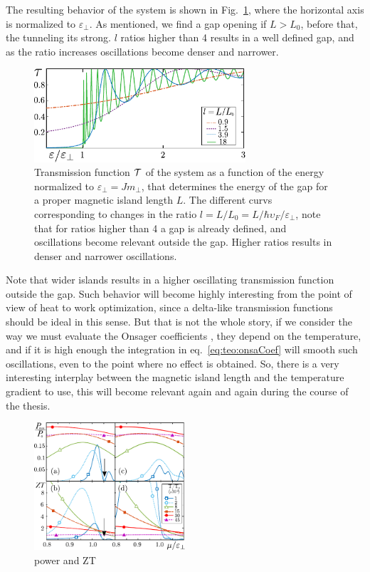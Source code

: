 The resulting behavior of the system is shown in Fig.~\ref{fig:teo:tau1isla}, where the horizontal axis is normalized to $\varepsilon_{\perp}$. As mentioned, we find a gap opening if $L > L_0$, before that, the tunneling its strong. $l$ ratios higher than 4 results in a well defined gap, and as the ratio increases oscillations become denser and narrower.
%
\begin{figure}
    \centering
    \includegraphics[width = 0.7\textwidth]{figures/theory/fig2.pdf}
    \caption{Transmission function $\mathcal{T}$ of the system as a function of the energy normalized to $\varepsilon_{\perp} = J m_{\perp}$, that determines the energy of the gap for a proper magnetic island length $L$. The different curvs corresponding to changes in the ratio $l = L/L_0 = L/\hbar \upsilon_F/\varepsilon_{\perp}$, note that for ratios higher than 4 a gap is already defined, and oscillations become relevant outside the gap. Higher ratios results in denser and narrower oscillations.}
    \label{fig:teo:tau1isla}
\end{figure}
%
Note that wider islands results in a higher oscillating transmission function outside the gap. Such behavior will become highly interesting from the point of view of heat to work optimization, since a delta-like transmission functions should be ideal in this sense. But that is not the whole story, if we consider the way we must evaluate the Onsager coefficients , they depend on the temperature, and if it is high enough the integration in eq.~\ref{eq:teo:onsaCoef} will smooth such oscillations, even to the point where no effect is obtained. So, there is a very interesting interplay between the magnetic island length and the temperature gradient to use, this will become relevant again and again during the course of the thesis.









\begin{figure}
    \centering
    \includegraphics[width = 0.5\textwidth]{figures/theory/fig3.pdf}
    \caption{power and ZT}
    \label{fig:teo:powerZT}
\end{figure}

